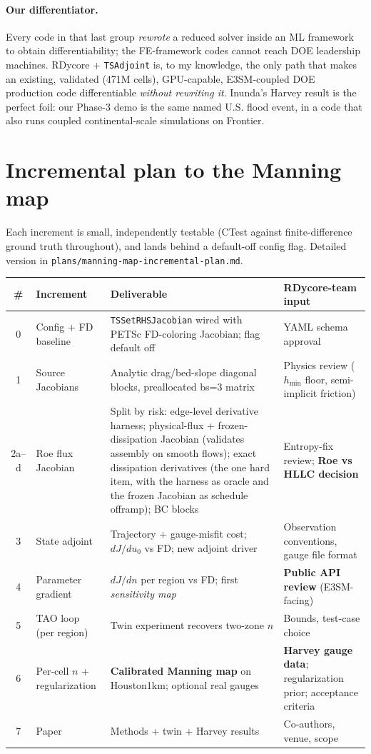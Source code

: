 \documentclass[11pt]{article}
\begin{document}
\paragraph{Our differentiator.}
Every code in that last group \emph{rewrote} a reduced solver inside an ML
framework to obtain differentiability; the FE-framework codes cannot reach
DOE leadership machines. RDycore + \texttt{TSAdjoint} is, to my knowledge,
the only path that makes an existing, validated (471M cells), GPU-capable,
E3SM-coupled DOE production code differentiable \emph{without rewriting it}.
Inunda's Harvey result is the perfect foil: our Phase-3 demo is the same
named U.S. flood event, in a code that also runs coupled continental-scale
simulations on Frontier.

\section{Incremental plan to the Manning map}
\label{sec:plan}

Each increment is small, independently testable (CTest against
finite-difference ground truth throughout), and lands behind a default-off
config flag. Detailed version in
\texttt{plans/manning-map-incremental-plan.md}.

\begin{center}
\begin{tabular}{@{}clp{5.6cm}p{4.6cm}@{}}
\toprule
\# & Increment & Deliverable & RDycore-team input \\
\midrule
0 & Config + FD baseline & \texttt{TSSetRHSJacobian} wired with PETSc
    FD-coloring Jacobian; flag default off & YAML schema approval \\
1 & Source Jacobians & Analytic drag/bed-slope diagonal blocks,
    preallocated bs=3 matrix & Physics review ($h_{\min}$ floor,
    semi-implicit friction) \\
2a--d & Roe flux Jacobian & Split by risk: edge-level derivative
    harness; physical-flux + frozen-dissipation Jacobian (validates
    assembly on smooth flows); exact dissipation derivatives (the one
    hard item, with the harness as oracle and the frozen Jacobian as
    schedule offramp); BC blocks & Entropy-fix review;
    \textbf{Roe vs HLLC decision} \\
3 & State adjoint & Trajectory + gauge-misfit cost; $dJ/du_0$ vs FD;
    new adjoint driver & Observation conventions, gauge file format \\
4 & Parameter gradient & $dJ/dn$ per region vs FD; first
    \emph{sensitivity map} & \textbf{Public API review} (E3SM-facing) \\
5 & TAO loop (per region) & Twin experiment recovers two-zone $n$ &
    Bounds, test-case choice \\
6 & Per-cell $n$ + regularization & \textbf{Calibrated Manning map} on
    Houston1km; optional real gauges & \textbf{Harvey gauge data};
    regularization prior; acceptance criteria \\
7 & Paper & Methods + twin + Harvey results & Co-authors, venue, scope \\
\bottomrule
\end{tabular}
\end{center}
\end{document}
